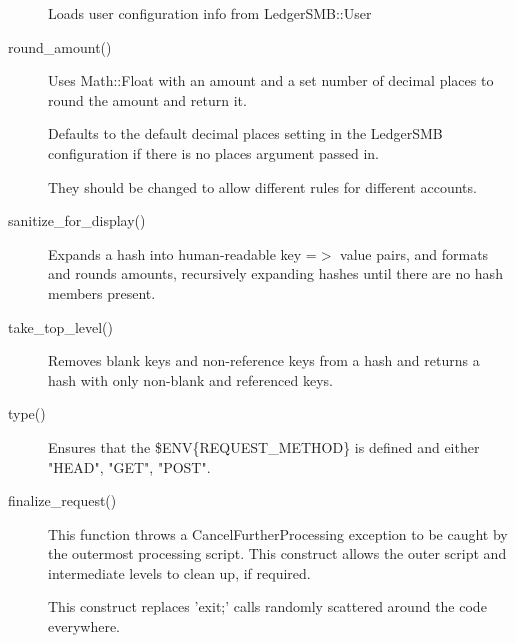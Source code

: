 \begin{description}
Loads user configuration info from LedgerSMB::User


\item[{round\_amount()}] \mbox{}

Uses Math::Float with an amount and a set number of decimal places to round the amount and return it.



Defaults to the default decimal places setting in the LedgerSMB configuration if there is no places argument passed in.



They should be changed to allow different rules for different accounts.


\item[{sanitize\_for\_display()}] \mbox{}

Expands a hash into human-readable key =$>$ value pairs, and formats and rounds amounts, recursively expanding hashes until there are no hash members present.


\item[{take\_top\_level()}] \mbox{}

Removes blank keys and non-reference keys from a hash and returns a hash with only non-blank and referenced keys.


\item[{type()}] \mbox{}

Ensures that the \$ENV\{REQUEST\_METHOD\} is defined and either "HEAD", "GET", "POST".


\item[{finalize\_request()}] \mbox{}

This function throws a CancelFurtherProcessing exception to be caught
by the outermost processing script.  This construct allows the outer
script and intermediate levels to clean up, if required.



This construct replaces 'exit;' calls randomly scattered
around the code everywhere.

\end{description}
